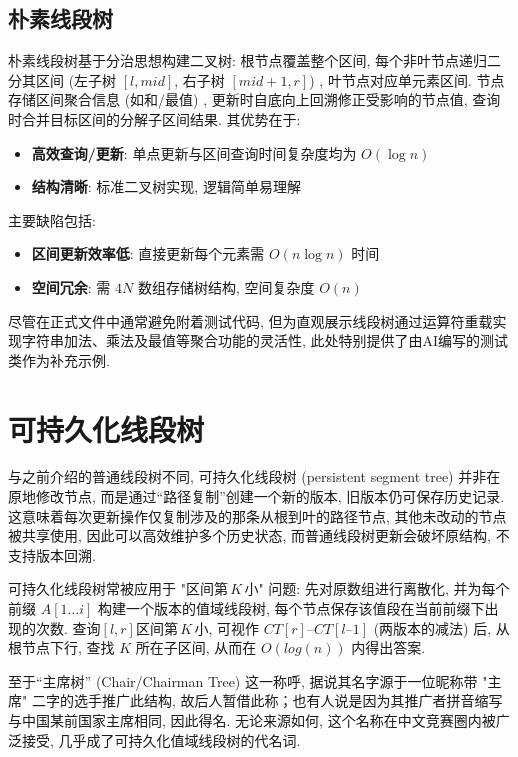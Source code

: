 \documentclass[a4paper]{ctexbook}
\begin{document}
\subsection*{朴素线段树}

朴素线段树基于分治思想构建二叉树: 根节点覆盖整个区间, 每个非叶节点递归二分其区间 (左子树 $[l, mid]$, 右子树 $[mid+1, r]$) , 叶节点对应单元素区间. 节点存储区间聚合信息 (如和/最值) , 更新时自底向上回溯修正受影响的节点值, 查询时合并目标区间的分解子区间结果. 其优势在于:
\begin{itemize}
	\item \textbf{高效查询/更新}: 单点更新与区间查询时间复杂度均为 $O(\log n)$
	\item \textbf{结构清晰}: 标准二叉树实现, 逻辑简单易理解
\end{itemize}
主要缺陷包括:
\begin{itemize}
	\item \textbf{区间更新效率低}: 直接更新每个元素需 $O(n \log n)$ 时间
	\item \textbf{空间冗余}: 需 $4N$ 数组存储树结构, 空间复杂度 $O(n)$
\end{itemize}

尽管在正式文件中通常避免附着测试代码, 但为直观展示线段树通过运算符重载实现字符串加法、乘法及最值等聚合功能的灵活性, 此处特别提供了由AI编写的测试类作为补充示例.



\section*{可持久化线段树}

与之前介绍的普通线段树不同, 可持久化线段树 (persistent segment tree) 并非在原地修改节点, 而是通过“路径复制”创建一个新的版本, 旧版本仍可保存历史记录. 这意味着每次更新操作仅复制涉及的那条从根到叶的路径节点, 其他未改动的节点被共享使用, 因此可以高效维护多个历史状态, 而普通线段树更新会破坏原结构, 不支持版本回溯.

可持久化线段树常被应用于 "区间第 $K$ 小" 问题: 先对原数组进行离散化, 并为每个前缀 $A[1\dots i]$ 构建一个版本的值域线段树, 每个节点保存该值段在当前前缀下出现的次数. 查询$[l,r]$区间第 $K$ 小, 可视作 $CT[r]–CT[l–1]$ (两版本的减法) 后, 从根节点下行, 查找 $K$ 所在子区间, 从而在 $O(log(n))$ 内得出答案.

至于“主席树” (Chair/Chairman Tree) 这一称呼, 据说其名字源于一位昵称带 "主席" 二字的选手推广此结构, 故后人暂借此称；也有人说是因为其推广者拼音缩写与中国某前国家主席相同, 因此得名. 无论来源如何, 这个名称在中文竞赛圈内被广泛接受, 几乎成了可持久化值域线段树的代名词.
\end{document}

